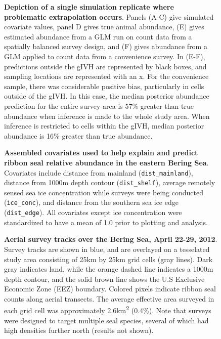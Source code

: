 \documentclass[10pt,letterpaper]{article}
\begin{document}
\begin{figure}[!h]
\caption{{\bf Depiction of a single simulation replicate where problematic extrapolation occurs}.  Panels (A-C) give simulated covariate values, panel D gives true animal abundance, (E) gives estimated abundance from a GLM run on count data from a spatially balanced survey design, and (F) gives abundance from a GLM applied to count data from a convenience survey.  In (E-F), predictions outside the gIVH are represented by black boxes, and sampling locations are represented with an x.  For the convenience sample, there was considerable positive bias, particularly in cells outside of the gIVH.  In this case, the median posterior abundance prediction for the entire survey area is 57\% greater than true abundance when inference is made to the whole study area.  When inference is restricted to cells within the gIVH, median posterior abundance is 16\% greater than true abundance.}
\label{fig:sim_maps}
\end{figure}

\begin{figure}[!h]
\caption{{\bf Assembled covariates used to help explain and predict ribbon seal relative abundance in the eastern Bering Sea}.  Covariates include distance from mainland (\texttt{dist\_mainland}), distance from 1000m depth contour (\texttt{dist\_shelf}), average remotely sensed sea ice concentration while surveys were being conducted (\texttt{ice\_conc}), and distance from the southern sea ice edge (\texttt{dist\_edge}).  All covariates except ice concentration were standardized to have a mean of 1.0 prior to plotting and analysis.
}
\label{fig:covs}
\end{figure}

\begin{figure}[!h]
\caption{{\bf Aerial survey tracks over the Bering Sea, April 22-29, 2012}. Survey tracks are shown in blue, and are overlayed on a tesselated study area consisting of 25km by 25km grid cells (gray lines).  Dark gray indicates land, while the orange dashed line indicates a 1000m depth contour, and the solid brown line shows the U.S Exclusive Economic Zone (EEZ) boundary. Colored pixels indicate ribbon seal counts along aerial transects. The average effective area surveyed in each grid cell was approximately 2.6km\textsuperscript{2} (0.4\%).  Note that surveys were designed to target multiple seal species, several of which had high densities further north (results not shown). }
\label{fig:flights}
\end{figure}
\end{document}
